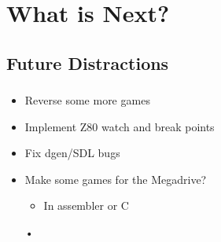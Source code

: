 \documentclass{beamer}
\begin{document}
\section{What is Next?}

\subsection{Future Distractions}

\begin{frame}[fragile]
\frametitle{\insertsubsection}

\begin{itemize}
\item Reverse some more games
\vfill
\item Implement Z80 watch and break points
\vfill
\item Fix dgen/SDL bugs
\vfill
\item Make some games for the Megadrive?
\begin{itemize}
\item In assembler or C
\end{itemize}•
\end{itemize}

\end{frame}

\end{document}
